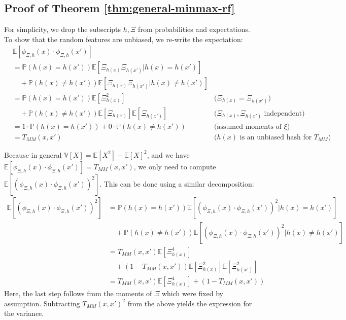 \documentclass{article}
\theoremstyle{plain}
\theoremstyle{definition}
\theoremstyle{remark}
\newcommand{\eq}[1]{\begin{align*}#1\end{align*}}
\renewcommand{\Pr}{\mathbb{P}}
\begin{document}
\subsection{Proof of Theorem \ref{thm:general-minmax-rf}}\label{apdx:minmax-rf-proof}

    For simplicity, we drop the subscripts $h,\Xi$ from probabilities and expectations. To show that the random features are unbiased, we re-write the expectation:
    \eq{
    &\mathbb{E}\left[ \phi_{\Xi,h}(x)\cdot \phi_{\Xi,h}(x')\right]  & \\
        &= \Pr(h(x)=h(x')) \mathbb{E} \left[ \Xi_{h(x)}\Xi_{h(x')} | h(x)=h(x')\right]  \nonumber & \\
           &\quad+ \Pr(h(x)\neq h(x')) \mathbb{E} \left[ \Xi_{h(x)}\Xi_{h(x')} | h(x)\neq h(x')\right] &\\
        &= \Pr(h(x)=h(x')) \mathbb{E} \left[ \Xi_{h(x)}^2 \right] &\text{(}\Xi_{h(x)}=\Xi_{h(x')}\text{)} \nonumber \\
        &\quad+ \Pr(h(x)\neq h(x')) \mathbb{E} \left[\Xi_{h(x)}\right] \mathbb{E} \left[\Xi_{h(x')}\right] & (\Xi_{h(x)},\Xi_{h(x')}\text{ independent)} \\
        &= 1\cdot \Pr(h(x)=h(x')) + 0\cdot \Pr(h(x)\neq h(x')) &\text{(assumed moments of }\xi) \\
        &= T_{MM}(x,x')& \text{($h(x)$ is an unbiased hash for $T_{MM}$)}
    }

    Because in general $\mathbb{V}[X]=\mathbb{E}[X^2]-\mathbb{E}[X]^2$,
    and we have $\mathbb{E}\left[ \phi_{\Xi,h}(x)\cdot \phi_{\Xi,h}(x')\right]=T_{MM}(x,x')$,
    we only need to compute
    $\mathbb{E}\left[ \left(\phi_{\Xi,h}(x)\cdot \phi_{\Xi,h}(x')\right)^2\right]$.
    This can be done using a similar decomposition:
    \eq{
        \mathbb{E}\left[ \left(\phi_{\Xi,h}(x)\cdot \phi_{\Xi,h}(x')\right)^2\right]&= \Pr(h(x)=h(x')) \mathbb{E}\left[ \left(\phi_{\Xi,h}(x)\cdot \phi_{\Xi,h}(x')\right)^2|h(x)=h(x')\right] \nonumber \\
        &\quad + \Pr(h(x)\neq h(x')) \mathbb{E}\left[ \left(\phi_{\Xi,h}(x)\cdot \phi_{\Xi,h}(x')\right)^2|h(x)\neq h(x')\right] \\
        &= T_{MM}(x,x') \mathbb{E}\left[ \Xi_{h(x)}^4 \right] \nonumber \\
        &\quad + \left(1-T_{MM}(x,x')\right) \mathbb{E}\left[ \Xi_{h(x)}^2 \right] \mathbb{E}\left[ \Xi_{h(x')}^2 \right] \\
        &= T_{MM}(x,x') \mathbb{E}\left[ \Xi_{h(x)}^4 \right] + \left(1-T_{MM}(x,x')\right) 
    }
    Here, the last step follows from the moments of $\Xi$ which were fixed by assumption.
    Subtracting $T_{MM}(x,x')^2$ from the above yields the expression for the variance.
\end{document}
